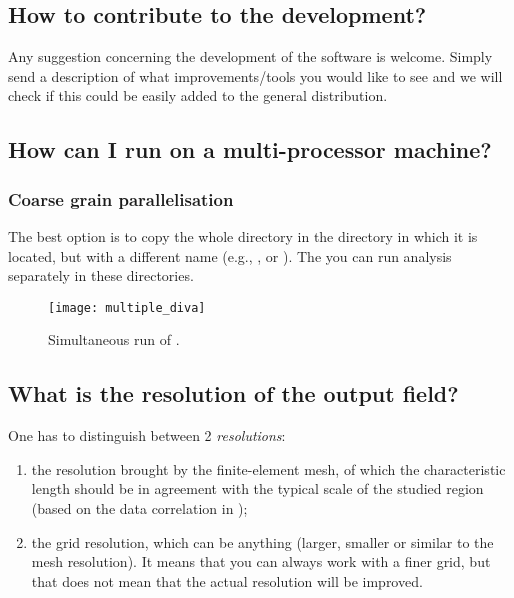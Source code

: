 %
%

\subsection{How to contribute to the development?}

Any suggestion concerning the development of the software is welcome. Simply send a description of what improvements/tools you would like to see and we will check if this could be easily added to the general distribution.


\subsection{How can I run \diva on a multi-processor machine?}

\subsubsection{Coarse grain parallelisation}

The best option is to copy the whole directory  in the directory in which it is located, but with a different name (e.g.,  , or ). The you can run \diva analysis separately in these directories. 


\begin{figure}[htpb]
\centering
\texttt{[image: multiple\_diva]}
\caption{Simultaneous run of \diva.}
\end{figure}


\subsection{What is the resolution of the output field?}

One has to distinguish between 2 \textit{resolutions}:

\begin{enumerate}
\item the resolution brought by the finite-element mesh, of which the characteristic length should be in agreement with the typical scale of the studied region (based on the data correlation in \diva);

\item the grid resolution, which can be anything (larger, smaller or similar to the mesh resolution). It means that you can always work with a finer grid, but that does not mean that the actual resolution will be improved.
\end{enumerate}

